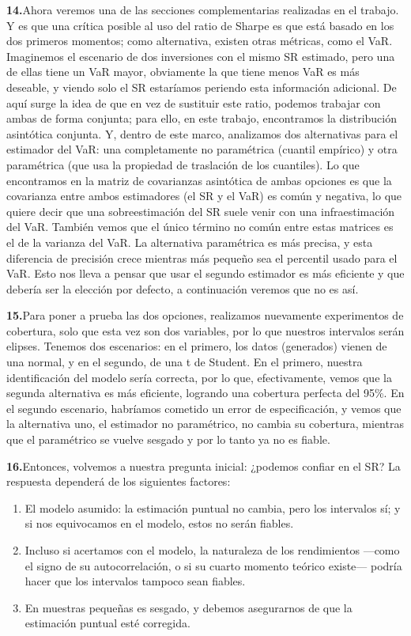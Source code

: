 \documentclass[11pt,a4paper]{article}
\newcommand{\seccionrule}{\vspace{-0.6em}{\color{accentblue}\hrule height 0.8pt}\vspace{0.8em}}
\newcommand{\diapo}[2]{%
  \par\medskip\noindent%
  \textbf{\textcolor{accentblue}{#1.}}\enspace #2\par\smallskip}
\begin{document}
\diapo{14}{Ahora veremos una de las secciones complementarias realizadas en el trabajo. Y es que una crítica posible al uso del ratio de Sharpe es que está
basado en los dos primeros momentos; como alternativa, existen otras
métricas, como el VaR. Imaginemos el escenario de dos inversiones con el mismo SR estimado, pero una de ellas tiene un VaR mayor, obviamente la que tiene menos VaR es más deseable, y viendo solo el SR estaríamos periendo esta información adicional. De aquí surge la idea de que en vez de sustituir este ratio, podemos
trabajar con ambas de forma conjunta; para ello, en este trabajo,
encontramos la distribución asintótica conjunta. Y, dentro de este marco,
analizamos dos alternativas para el estimador del VaR: una completamente
no paramétrica (cuantil empírico) y otra paramétrica (que usa la
propiedad de traslación de los cuantiles).
Lo que encontramos en la matriz de covarianzas asintótica de ambas
opciones es que la covarianza entre ambos estimadores (el SR y el VaR) es
común y negativa, lo que quiere decir que una sobreestimación del SR
suele venir con una infraestimación del VaR. También vemos que el único
término no común entre estas matrices es el de la varianza del VaR. La
alternativa paramétrica es más precisa, y esta diferencia de precisión crece mientras
más pequeño sea el percentil usado para el VaR. Esto nos lleva a pensar que usar el
segundo estimador es más eficiente y que debería ser la elección por defecto, a continuación veremos que no es así.}

\diapo{15}{Para poner a prueba las dos opciones, realizamos nuevamente
experimentos de cobertura, solo que esta vez son dos variables, por lo
que nuestros intervalos serán elipses.
Tenemos dos escenarios: en el primero, los datos (generados) vienen de una normal, y
en el segundo, de una t de Student. En el primero, nuestra identificación
del modelo sería correcta, por lo que, efectivamente, vemos que la
segunda alternativa es más eficiente, logrando una cobertura perfecta del
95\%. En el segundo escenario, habríamos cometido un error de
especificación, y vemos que la alternativa uno, el estimador no
paramétrico, no cambia su cobertura, mientras que el paramétrico se
vuelve sesgado y por lo tanto ya no es fiable.}

\diapo{16}{Entonces, volvemos a nuestra pregunta inicial: ¿podemos
confiar en el SR? La respuesta dependerá de los siguientes
factores:
\begin{enumerate}[label=\arabic*),leftmargin=1.6em,itemsep=2pt,topsep=4pt]
  \item El modelo asumido: la estimación puntual no cambia, pero los
    intervalos sí; y si nos equivocamos en el modelo, estos no serán
    fiables.
  \item Incluso si acertamos con el modelo, la naturaleza de los
    rendimientos —como el signo de su autocorrelación, o si su cuarto
    momento teórico existe— podría hacer que los intervalos tampoco
    sean fiables.
  \item En muestras pequeñas es sesgado, y debemos asegurarnos de que la
    estimación puntual esté corregida.
\end{enumerate}}

\vspace{1.2em}
\seccionrule
\end{document}
